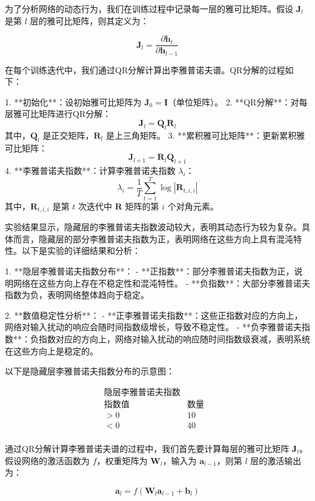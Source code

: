 \documentclass[12pt,a4paper]{amsart}
\begin{document}
为了分析网络的动态行为，我们在训练过程中记录每一层的雅可比矩阵。假设 \(\mathbf{J}_l\) 是第 \(l\) 层的雅可比矩阵，则其定义为：

\[
\mathbf{J}_l = \frac{\partial \mathbf{h}_l}{\partial \mathbf{h}_{l-1}}
\]

在每个训练迭代中，我们通过QR分解计算出李雅普诺夫谱。QR分解的过程如下：

1. **初始化**：设初始雅可比矩阵为 \(\mathbf{J}_0 = \mathbf{I}\)（单位矩阵）。
2. **QR分解**：对每层雅可比矩阵进行QR分解：
   \[
   \mathbf{J}_l = \mathbf{Q}_l \mathbf{R}_l
   \]
   其中，\(\mathbf{Q}_l\) 是正交矩阵，\(\mathbf{R}_l\) 是上三角矩阵。
3. **累积雅可比矩阵**：更新累积雅可比矩阵：
   \[
   \mathbf{J}_{l+1} = \mathbf{R}_l \mathbf{Q}_{l+1}
   \]
4. **李雅普诺夫指数**：计算李雅普诺夫指数 \(\lambda_i\)：
   \[
   \lambda_i = \frac{1}{T} \sum_{t=1}^T \log |\mathbf{R}_{t,i,i}|
   \]
   其中，\(\mathbf{R}_{t,i,i}\) 是第 \(t\) 次迭代中 \(\mathbf{R}\) 矩阵的第 \(i\) 个对角元素。

实验结果显示，隐藏层的李雅普诺夫指数波动较大，表明其动态行为较为复杂。具体而言，隐藏层的部分李雅普诺夫指数为正，表明网络在这些方向上具有混沌特性。以下是实验的详细结果和分析：

1. **隐层李雅普诺夫指数分布**：
   - **正指数**：部分李雅普诺夫指数为正，说明网络在这些方向上存在不稳定性和混沌特性。
   - **负指数**：大部分李雅普诺夫指数为负，表明网络整体趋向于稳定。

2. **数值稳定性分析**：
   - **正李雅普诺夫指数**：这些正指数对应的方向上，网络对输入扰动的响应会随时间指数级增长，导致不稳定性。
   - **负李雅普诺夫指数**：负指数对应的方向上，网络对输入扰动的响应随时间指数级衰减，表明系统在这些方向上是稳定的。

以下是隐藏层李雅普诺夫指数分布的示意图：

\[
\begin{array}{ccc}
\text{隐层李雅普诺夫指数} & & \\
\hline
\text{指数值} & \text{数量} \\
\hline
>0 & 10 \\
<0 & 40 \\
\end{array}
\]

通过QR分解计算李雅普诺夫谱的过程中，我们首先要计算每层的雅可比矩阵 \(\mathbf{J}_l\)。假设网络的激活函数为 \( f \)，权重矩阵为 \(\mathbf{W}_l\)，输入为 \(\mathbf{a}_{l-1}\)，则第 \(l\) 层的激活输出为：

\[
\mathbf{a}_l = f(\mathbf{W}_l \mathbf{a}_{l-1} + \mathbf{b}_l)
\]
\end{document}
